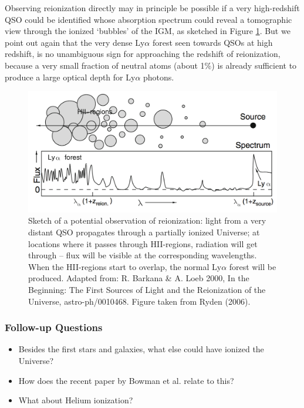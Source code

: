 \documentclass[a4paper,11pt]{article}
\begin{document}
{\noindent}Observing reionization directly may in principle be possible if a very high-redshift QSO could be identified whose absorption spectrum could reveal a tomographic view through the ionized `bubbles' of the IGM, as sketched in Figure \ref{fig:lyaforest}. But we point out again that the very dense Ly$\alpha$ forest seen towards QSOs at high redshift, is no unambiguous sign for approaching the redshift of reionization, because a very small fraction of neutral atoms (about 1\%) is already sufficient to produce a large optical depth for Ly$\alpha$ photons.

\begin{figure}[h!]
    \includegraphics[width=14cm]{figures/LyaForest.png}
    \centering
    \caption{\footnotesize{Sketch of a potential observation of reionization: light from a very distant QSO propagates through a partially ionized Universe; at locations where it passes through HII-regions, radiation will get through -- flux will be visible at the corresponding wavelengths. When the HII-regions start to overlap, the normal Ly$\alpha$ forest will be produced. Adapted from: R. Barkana \& A. Loeb 2000, In the Beginning: The First Sources of Light and the Reionization of the Universe, astro-ph/0010468. Figure taken from Ryden (2006).}}
    \label{fig:lyaforest}
\end{figure}

\subsubsection{Follow-up Questions}

\begin{itemize}
    \item Besides the first stars and galaxies, what else could have ionized the Universe?
    \item How does the recent paper by Bowman et al. relate to this?
    \item What about Helium ionization?
\end{itemize}
\end{document}
